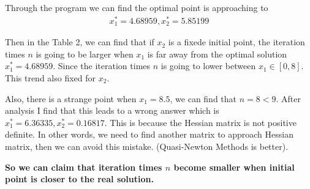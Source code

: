 \documentclass{report}
\begin{document}
\par Through the program we can find the optimal point is approaching to 
\begin{align*}
    x_1^* = 4.68959, x_2^* = 5.85199
\end{align*}


Then in the {Table 2}, we can find that if $x_2$ is a fixede initial point, the iteration times $n$ 
is going to be larger when $x_1$ is far away from the optimal solution $x_1^* = 4.68959$. 
Since the iteration times $n$ is going to lower between $x_1\in [0,8]$.
This trend also fixed for $x_2$. 
\par Also, there is a strange point when $x_1=8.5$, we can find that $n=8<9$.
After analysis I find that this leads to a wrong answer which is 
$x_1^* =6.36335, x_2^*=0.16817$. This is because the Hessian matrix is not positive definite. 
In other words, we need to find another matrix to approach Hessian matrix, then we can avoid this mistake. (Quasi-Newton Methods is better). 

{\bf So we can claim that iteration times $n$ become smaller when initial point is closer to the real solution. }
\end{document}
